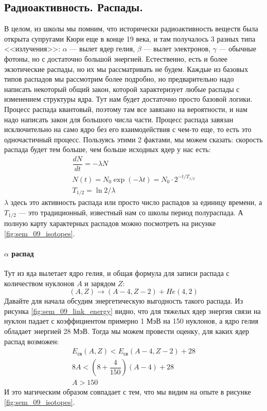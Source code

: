 \documentclass[12pt]{article}
\begin{document}
\subsection{Радиоактивность. Распады.}
В целом, из школы мы помним, что исторически радиоактивность веществ была открыта супругами Кюри еще в конце 19 века, и там получалось 3 разных типа <<излучения>>: $\alpha$ --- вылет ядер гелия, $\beta$ --- вылет электронов,  $\gamma$ --- обычные фотоны, но с достаточно большой энергией. Естественно, есть и более экзотические распады, но их мы рассматривать не будем. Каждые из базовых типов распадов мы рассмотрим более подробно, но предварительно надо написать некоторый общий закон, которой характеризует любые распады с изменением структуры ядра. Тут нам будет достаточно просто базовой логики. Процесс распада квантовый, поэтому там все завязано на вероятности, и нам надо написать закон для большого числа части. Процесс распада завязан исключительно на само ядро без его взаимодействия с чем-то еще, то есть это одночастичный процесс. Пользуясь этими 2 фактами, мы можем сказать: скорость распада будет тем больше, чем больше исходных ядер у нас есть:
\begin{gather*}
\dfrac{dN}{dt} = -\lambda N\\
N(t) = N_0 \exp{(-\lambda t)} = N_0\cdot 2^{-t/T_{1/2}}\\
T_{1/2} = \ln{2} / \lambda
\end{gather*}
$\lambda$ здесь это активность распада или просто число распадов за единицу времени, а $T_{1/2}$ --- это традиционный, известный нам со школы период полураспада. А полную карту характерных распадов можно посмотреть на рисунке \ref{fig:sem_09_isotopes}.

\paragraph{$\alpha$ распад}
Тут из яда вылетает ядро гелия, и общая формула для записи распада с количеством нуклонов $A$ и зарядом $Z$: 
\begin{equation*}
    (A,Z) \rightarrow (A-4, Z-2) + He(4,2)
\end{equation*}
Давайте для начала обсудим энергетическую выгодность такого распада. Из рисунка \ref{fig:sem_09_link_energy} видно, что для тяжелых ядер энергия связи на нуклон падает с коэффициентом примерно 1 МэВ на 150 нуклонов, а ядро гелия обладает энергией 28 МэВ. Тогда мы можем провести оценку, для каких ядер распад возможен:
\begin{gather*}
    E_{\text{св}}(A, Z) < E_{\text{св}}(A-4, Z-2) +28\\
    8A < \left (8 + \dfrac{4}{150} \right) (A-4) + 28\\
    A > 150
\end{gather*}
И это магическим образом совпадает с тем, что мы видим на опыте в рисунке \ref{fig:sem_09_isotopes}. 
\end{document}
